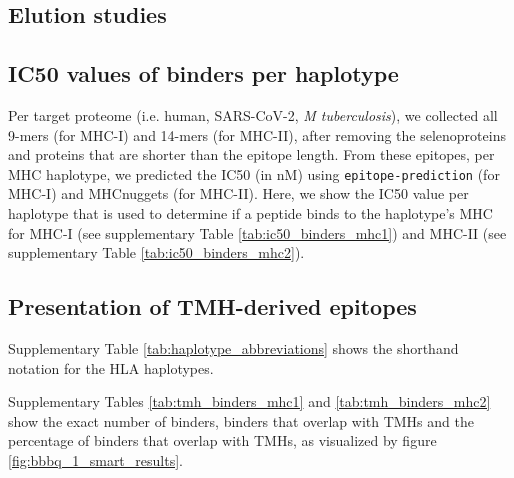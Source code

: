 \subsection{Elution studies}



\subsection{IC50 values of binders per haplotype}
\label{subsec:ic50s_per_haplotype}

Per target proteome (i.e. human, SARS-CoV-2, \emph{M tuberculosis}),
we collected all 9-mers (for MHC-I) and 14-mers (for MHC-II),
after removing the selenoproteins and proteins that are shorter
than the epitope length.
From these epitopes, per MHC haplotype,
we predicted the IC50 (in nM) using \verb;epitope-prediction; (for MHC-I)
and MHCnuggets (for MHC-II). 
Here, we show the IC50 value per haplotype that
is used to determine if a peptide binds to the haplotype's MHC
for MHC-I (see supplementary Table \ref{tab:ic50_binders_mhc1}) and 
MHC-II (see supplementary Table \ref{tab:ic50_binders_mhc2}).





\subsection{Presentation of TMH-derived epitopes}

Supplementary Table \ref{tab:haplotype_abbreviations} shows the
shorthand notation for the HLA haplotypes.



Supplementary Tables \ref{tab:tmh_binders_mhc1} and \ref{tab:tmh_binders_mhc2}
show the exact number of binders, binders that overlap with TMHs
and the percentage of binders that overlap with TMHs, as
visualized by figure \ref{fig:bbbq_1_smart_results}.

